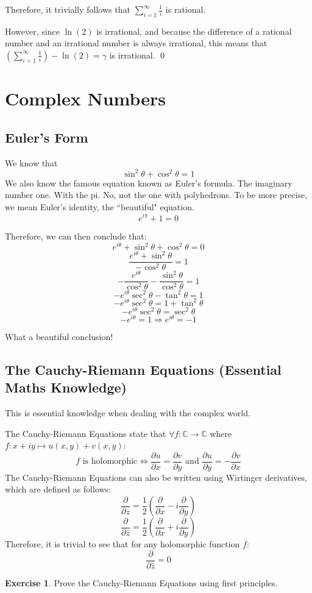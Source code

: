 \documentclass[a4paper]{article}
\theoremstyle{plain}
\theoremstyle{definition}
\newtheorem{exercise}{Exercise}[section]
\theoremstyle{remark}
\newcommand{\sectionSpace}{\vspace{2em}} %
\begin{document}
Therefore, it trivially follows that $\sum\limits_{i=1}^{\infty} \frac{1}{i}$ is rational.

However, since $\ln(2)$ is irrational, and because the difference of a rational number and an irrational number is always irrational, this means that $\left(\sum\limits_{i=1}^{\infty} \frac{1}{i}\right)-\ln (2)=\gamma$ is irrational.
\qed


\sectionSpace
\section{Complex Numbers}
    \subsection{Euler's Form}
    We know that
    $$\sin^2\theta + \cos^2\theta = 1$$
    We also know the famous equation known as Euler's formula. The imaginary number one. With the pi. No, not the one with polyhedrons. To be more precise, we mean Euler's identity, the ``beautiful" equation.
    $$e^{i\pi} + 1 = 0$$

    Therefore, we can then conclude that:
    $$e^{i\theta} + \sin^2\theta + \cos^2\theta = 0$$
    $$\frac{e^{i\theta} + \sin^2\theta}{-\cos^2\theta} = 1$$
    $$-\frac{e^{i\theta}}{\cos^2\theta} -\frac{\sin^2\theta}{\cos^2\theta} = 1$$
    $$-e^{i\theta}\sec^2\theta -\tan^2\theta = 1$$
    $$-e^{i\theta}\sec^2\theta = 1 + \tan^2\theta$$
    $$-e^{i\theta}\sec^2\theta = \sec^2\theta$$
    $$-e^{i\theta} = 1 \Rightarrow e^{i\theta} = -1$$

    What a beautiful conclusion!

    \subsection{The Cauchy-Riemann Equations (Essential Maths Knowledge)}
    This is essential knowledge when dealing with the complex world.

    The Cauchy-Riemann Equations state that $\forall f:\mathbb{C}\to\mathbb{C}$ where $f:x+iy\mapsto u(x,y)+v(x,y)$:
    $$f \text{ is holomorphic}\Leftrightarrow \frac {\partial u}{\partial x}=\frac {\partial v}{\partial y} \text { and }\frac {\partial u}{\partial y}=-{\frac {\partial v}{\partial x}}$$
    The Cauchy-Riemann Equations can also be written using Wirtinger derivatives, which are defined as follows:
    $$\frac {\partial }{\partial z}={\frac {1}{2}}\left({\frac {\partial }{\partial x}}-i{\frac {\partial }{\partial y}}\right)$$
    $${\frac {\partial }{\partial {\bar {z}}}}={\frac {1}{2}}\left({\frac {\partial }{\partial x}}+i{\frac {\partial }{\partial y}}\right)$$
    Therefore, it is trivial to see that for any holomorphic function $f$:
    $${\frac {\partial }{\partial {\bar {z}}}}=0$$
    \begin{exercise}
        Prove the Cauchy-Riemann Equations using first principles.
    \end{exercise}
\end{document}

